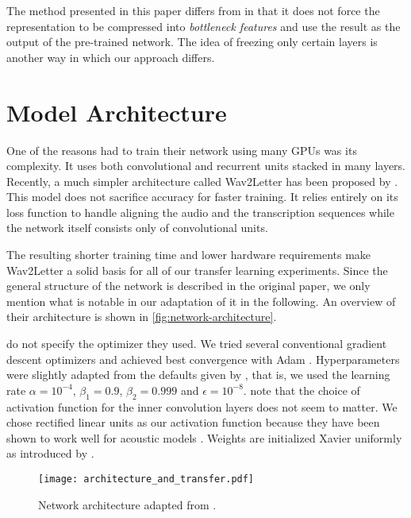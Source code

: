 \documentclass[11pt,a4paper]{article}
\begin{document}
The method presented in this paper differs from \citet{conf/interspeech/VuS13} in that it does not force the representation to be compressed into \emph{bottleneck features} \cite{grezl2008optimizing} and use the result as the output of the pre-trained network.
The idea of freezing only certain layers is another way in which our approach differs.


\section{Model Architecture}\label{sec:model-architecture}

One of the reasons \citet{DBLP:journals/corr/AmodeiABCCCCCCD15} had to train their network using many GPUs was its complexity.
It uses both convolutional and recurrent units stacked in many layers.
Recently, a much simpler architecture called Wav2Letter has been proposed by \citet{collobert_wav2letter_2016}.
This model does not sacrifice accuracy for faster training.
It relies entirely on its loss function to handle aligning the audio and the transcription sequences while the network itself consists only of convolutional units.

The resulting shorter training time and lower hardware requirements make Wav2Letter a solid basis for all of our transfer learning experiments.
Since the general structure of the network is described in the original paper, we only mention what is notable in our adaptation of it in the following.
An overview of their architecture is shown in \autoref{fig:network-architecture}.

\citet{collobert_wav2letter_2016} do not specify the optimizer they used.
We tried several conventional gradient descent optimizers and achieved best convergence with Adam \cite{DBLP:journals/corr/KingmaB14}.
Hyperparameters were slightly adapted from the defaults given by \citet{DBLP:journals/corr/KingmaB14}, that is, we used the learning rate $\alpha = 10^{-4}$, $\beta_{1} = 0.9$, $\beta_{2} = 0.999$ and $\epsilon = 10^{-8}$.
\citet{collobert_wav2letter_2016} note that the choice of activation function for the inner convolution layers does not seem to matter.
We chose rectified linear units as our activation function because they have been shown to work well for acoustic models \cite{maas2013rectifier}.
Weights are initialized Xavier uniformly as introduced by \citet{glorot2010understanding}.

\begin{figure}[tb!]
  \texttt{[image: architecture\_and\_transfer.pdf]}
  \caption{Network architecture adapted from \citet{collobert_wav2letter_2016}.}
  \label{fig:network-architecture}
\end{figure}
\end{document}
